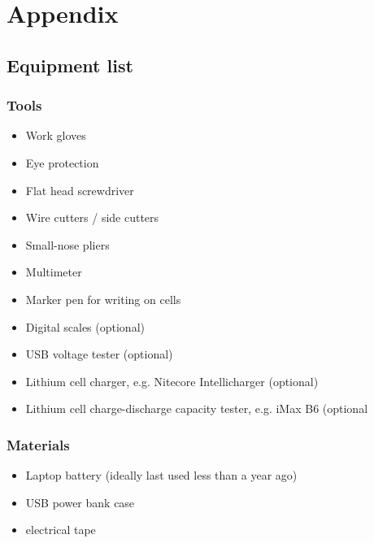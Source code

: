 \documentclass{article}
\theoremstyle{definition}
\theoremstyle{definition}
\theoremstyle{remark}
\begin{document}


\newpage

\section{Appendix} %
\label{sec:appendix}

  \subsection{Equipment list} %
  \label{sub:equipment_list}

    \subsubsection*{Tools} %
    \label{ssub:tools}
    
      \begin{itemize}
        \item Work gloves
        \item Eye protection
        \item Flat head screwdriver
        \item Wire cutters / side cutters
        \item Small-nose pliers
        \item Multimeter
        \item Marker pen for writing on cells
        \item Digital scales (optional)
        \item USB voltage tester (optional)
        \item Lithium cell charger, e.g. Nitecore Intellicharger (optional)
        \item Lithium cell charge-discharge capacity tester, e.g. iMax B6 (optional
      \end{itemize}


    \subsubsection*{Materials} %
    \label{ssub:materials}
    
      \begin{itemize}
        \item Laptop battery (ideally last used less than a year ago)
        \item USB power bank case
        \item electrical tape
      \end{itemize}
    
\end{document}
